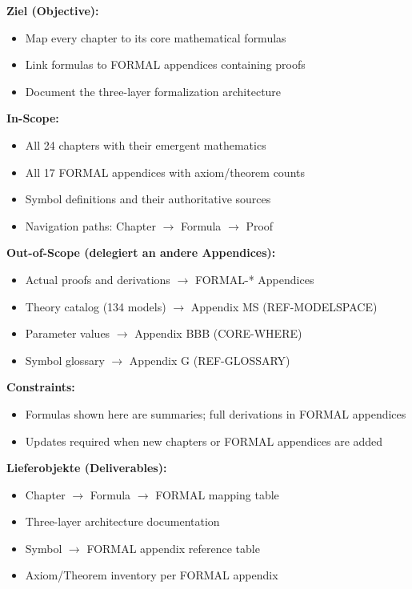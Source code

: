 \begin{tcolorbox}[
    colback=orange!5!white,
    colframe=orange!75!black,
    title={\textbf{Appendix Scope: Ziel / In-Scope / Out-of-Scope / Constraints}},
    fonttitle=\bfseries
]

\textbf{Ziel (Objective):}
\begin{itemize}[nosep]
    \item Map every chapter to its core mathematical formulas
    \item Link formulas to FORMAL appendices containing proofs
    \item Document the three-layer formalization architecture
\end{itemize}

\textbf{In-Scope:}
\begin{itemize}[nosep]
    \item All 24 chapters with their emergent mathematics
    \item All 17 FORMAL appendices with axiom/theorem counts
    \item Symbol definitions and their authoritative sources
    \item Navigation paths: Chapter $\rightarrow$ Formula $\rightarrow$ Proof
\end{itemize}

\textbf{Out-of-Scope (delegiert an andere Appendices):}
\begin{itemize}[nosep]
    \item Actual proofs and derivations $\rightarrow$ FORMAL-* Appendices
    \item Theory catalog (134 models) $\rightarrow$ Appendix MS (REF-MODELSPACE)
    \item Parameter values $\rightarrow$ Appendix BBB (CORE-WHERE)
    \item Symbol glossary $\rightarrow$ Appendix G (REF-GLOSSARY)
\end{itemize}

\textbf{Constraints:}
\begin{itemize}[nosep]
    \item Formulas shown here are summaries; full derivations in FORMAL appendices
    \item Updates required when new chapters or FORMAL appendices are added
\end{itemize}

\textbf{Lieferobjekte (Deliverables):}
\begin{itemize}[nosep]
    \item Chapter $\rightarrow$ Formula $\rightarrow$ FORMAL mapping table
    \item Three-layer architecture documentation
    \item Symbol $\rightarrow$ FORMAL appendix reference table
    \item Axiom/Theorem inventory per FORMAL appendix
\end{itemize}

\end{tcolorbox}

